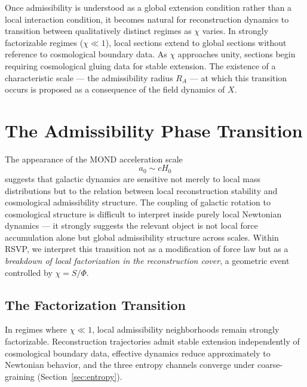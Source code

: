 \documentclass[11pt, a4paper]{article}
\theoremstyle{plain}
\theoremstyle{definition}
\theoremstyle{remark}
\newcommand{\RA}{R_{\!A}}
\begin{document}
Once admissibility is understood as a global extension condition rather than a local
interaction condition, it becomes natural for reconstruction dynamics to transition
between qualitatively distinct regimes as $\chi$ varies. In strongly factorizable
regimes ($\chi \ll 1$), local sections extend to global sections without reference to
cosmological boundary data. As $\chi$ approaches unity, sections begin requiring
cosmological gluing data for stable extension. The existence of a characteristic
scale --- the admissibility radius $\RA$ --- at which this transition occurs is
proposed as a consequence of the field dynamics of $X$.

\section{The Admissibility Phase Transition}
\label{sec:transition}

The appearance of the MOND acceleration scale \cite{milgrom1983,mcgaugh2011}
\begin{equation}
  a_0 \sim cH_0
\end{equation}
suggests that galactic dynamics are sensitive not merely to local mass distributions
but to the relation between local reconstruction stability and cosmological
admissibility structure. The coupling of galactic rotation to cosmological structure
is difficult to interpret inside purely local Newtonian dynamics --- it strongly
suggests the relevant object is not local force accumulation alone but global
admissibility structure across scales. Within RSVP, we interpret this transition not
as a modification of force law but as a \emph{breakdown of local factorization in the
reconstruction cover}, a geometric event controlled by $\chi = S/\Phi$.

\subsection{The Factorization Transition}

In regimes where $\chi \ll 1$, local admissibility neighborhoods remain strongly
factorizable. Reconstruction trajectories admit stable extension independently of
cosmological boundary data, effective dynamics reduce approximately to Newtonian
behavior, and the three entropy channels converge under coarse-graining
(Section~\ref{sec:entropy}).
\end{document}
